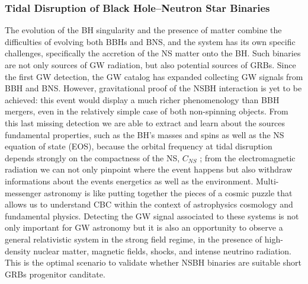 \documentclass[binding=0.6cm, LaM]{sapthesis}
\begin{document}
\subsubsection{Tidal Disruption of Black Hole--Neutron Star Binaries}
        The evolution of the BH singularity and the presence of matter combine
        the difficulties of evolving both BBHs and BNS, and the system has its own specific challenges,
        specifically the accretion of the NS matter onto the BH.
        Such binaries are not only sources of GW radiation, but also potential sources of GRBs.
        Since the first GW detection, the GW catalog has expanded collecting GW signals from BBH and BNS.
        However, gravitational proof of the NSBH interaction is yet to be achieved:
        this event would display a much richer phenomenology than BBH mergers,
        even in the relatively simple case of both non-spinning objects.
        From this last missing detection we are able to extract and learn about
        the sources fundamental properties, such as the BH’s masses and spins
        as well as the NS equation of state (EOS), because the orbital frequency at tidal disruption
        depends strongly on the compactness of the NS, $C_{NS}$ \cite{204};
        from the electromagnetic radiation we can not only
        pinpoint where the event happens but also withdraw informations about the events energetics as well as the environment.
        Multi-messenger astronomy is like putting together the pieces of a cosmic puzzle
        that allows us to understand CBC within the context of astrophysics cosmology and fundamental physics.
        Detecting the GW signal associated to these systems is not only important for
        GW astronomy but it is also an opportunity to observe a general relativistic system in the strong field regime,
        in the presence of high-density nuclear matter, magnetic fields, shocks, and intense neutrino radiation.
        This is the optimal scenario to validate whether NSBH binaries are suitable short GRBs progenitor canditate.
\end{document}
